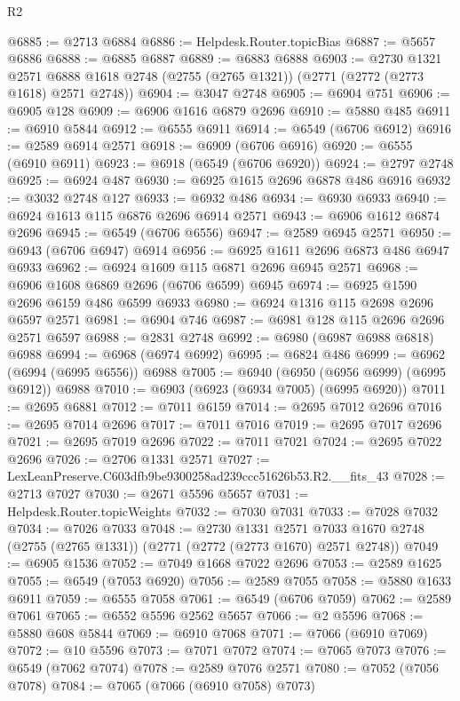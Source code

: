\begin{lexlean}{R2}
\begin{coremodule}
@6885 := @2713 @6884
@6886 := Helpdesk.Router.topicBias
@6887 := @5657 @6886
@6888 := @6885 @6887
@6889 := @6883 @6888
@6903 := @2730
    @1321
    @2571
    @6888
    @1618
    @2748
    (@2755 (@2765 @1321))
    (@2771 (@2772 (@2773 @1618) @2571 @2748))
@6904 := @3047 @2748
@6905 := @6904 @751
@6906 := @6905 @128
@6909 := @6906 @1616 @6879 @2696
@6910 := @5880 @485
@6911 := @6910 @5844
@6912 := @6555 @6911
@6914 := @6549 (@6706 @6912)
@6916 := @2589 @6914 @2571
@6918 := @6909 (@6706 @6916)
@6920 := @6555 (@6910 @6911)
@6923 := @6918 (@6549 (@6706 @6920))
@6924 := @2797 @2748
@6925 := @6924 @487
@6930 := @6925 @1615 @2696 @6878 @486 @6916
@6932 := @3032 @2748 @127
@6933 := @6932 @486
@6934 := @6930 @6933
@6940 := @6924 @1613 @115 @6876 @2696 @6914 @2571
@6943 := @6906 @1612 @6874 @2696
@6945 := @6549 (@6706 @6556)
@6947 := @2589 @6945 @2571
@6950 := @6943 (@6706 @6947) @6914
@6956 := @6925 @1611 @2696 @6873 @486 @6947 @6933
@6962 := @6924 @1609 @115 @6871 @2696 @6945 @2571
@6968 := @6906 @1608 @6869 @2696 (@6706 @6599) @6945
@6974 := @6925 @1590 @2696 @6159 @486 @6599 @6933
@6980 := @6924 @1316 @115 @2698 @2696 @6597 @2571
@6981 := @6904 @746
@6987 := @6981 @128 @115 @2696 @2696 @2571 @6597
@6988 := @2831 @2748
@6992 := @6980 (@6987 @6988 @6818) @6988
@6994 := @6968 (@6974 @6992)
@6995 := @6824 @486
@6999 := @6962 (@6994 (@6995 @6556)) @6988
@7005 := @6940 (@6950 (@6956 @6999) (@6995 @6912)) @6988
@7010 := @6903 (@6923 (@6934 @7005) (@6995 @6920))
@7011 := @2695 @6881
@7012 := @7011 @6159
@7014 := @2695 @7012 @2696
@7016 := @2695 @7014 @2696
@7017 := @7011 @7016
@7019 := @2695 @7017 @2696
@7021 := @2695 @7019 @2696
@7022 := @7011 @7021
@7024 := @2695 @7022 @2696
@7026 := @2706 @1331 @2571
@7027 := LexLeanPreserve.C603dfb9be9300258ad239ccc51626b53.R2.__fits_43
@7028 := @2713 @7027
@7030 := @2671 @5596 @5657
@7031 := Helpdesk.Router.topicWeights
@7032 := @7030 @7031
@7033 := @7028 @7032
@7034 := @7026 @7033
@7048 := @2730
    @1331
    @2571
    @7033
    @1670
    @2748
    (@2755 (@2765 @1331))
    (@2771 (@2772 (@2773 @1670) @2571 @2748))
@7049 := @6905 @1536
@7052 := @7049 @1668 @7022 @2696
@7053 := @2589 @1625
@7055 := @6549 (@7053 @6920)
@7056 := @2589 @7055
@7058 := @5880 @1633 @6911
@7059 := @6555 @7058
@7061 := @6549 (@6706 @7059)
@7062 := @2589 @7061
@7065 := @6552 @5596 @2562 @5657
@7066 := @2 @5596
@7068 := @5880 @608 @5844
@7069 := @6910 @7068
@7071 := @7066 (@6910 @7069)
@7072 := @10 @5596
@7073 := @7071 @7072
@7074 := @7065 @7073
@7076 := @6549 (@7062 @7074)
@7078 := @2589 @7076 @2571
@7080 := @7052 (@7056 @7078)
@7084 := @7065 (@7066 (@6910 @7058) @7073)

\end{coremodule}
\end{lexlean}
